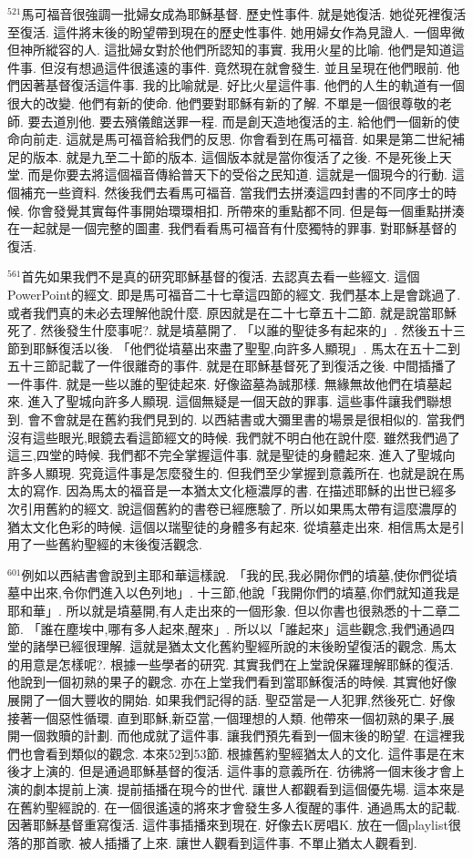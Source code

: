 \documentclass{book}
\begin{document}
$^{521}$馬可福音很強調一批婦女成為耶穌基督.
歷史性事件.
就是她復活.
她從死裡復活至復活.
這件將末後的盼望帶到現在的歷史性事件.
她用婦女作為見證人.
一個卑微但神所縱容的人.
這批婦女對於他們所認知的事實.
我用火星的比喻.
他們是知道這件事.
但沒有想過這件很遙遠的事件.
竟然現在就會發生.
並且呈現在他們眼前.
他們因著基督復活這件事.
我的比喻就是.
好比火星這件事.
他們的人生的軌道有一個很大的改變.
他們有新的使命.
他們要對耶穌有新的了解.
不單是一個很尊敬的老師.
要去道別他.
要去殯儀館送罪一程.
而是創天造地復活的主.
給他們一個新的使命向前走.
這就是馬可福音給我們的反思.
你會看到在馬可福音.
如果是第二世紀補足的版本.
就是九至二十節的版本.
這個版本就是當你復活了之後.
不是死後上天堂.
而是你要去將這個福音傳給普天下的受俗之民知道.
這就是一個現今的行動.
這個補充一些資料.
然後我們去看馬可福音.
當我們去拼湊這四封書的不同序士的時候.
你會發覺其實每件事開始環環相扣.
所帶來的重點都不同.
但是每一個重點拼湊在一起就是一個完整的圖畫.
我們看看馬可福音有什麼獨特的罪事.
對耶穌基督的復活.

$^{561}$首先如果我們不是真的研究耶穌基督的復活.
去認真去看一些經文.
這個PowerPoint的經文.
即是馬可福音二十七章這四節的經文.
我們基本上是會跳過了.
或者我們真的未必去理解他說什麼.
原因就是在二十七章五十二節.
就是說當耶穌死了.
然後發生什麼事呢?.
就是墳墓開了.
「以誰的聖徒多有起來的」.
然後五十三節到耶穌復活以後.
「他們從墳墓出來盡了聖聖,向許多人顯現」.
馬太在五十二到五十三節記載了一件很離奇的事件.
就是在耶穌基督死了到復活之後.
中間插播了一件事件.
就是一些以誰的聖徒起來.
好像盜墓為誠那樣.
無緣無故他們在墳墓起來.
進入了聖城向許多人顯現.
這個無疑是一個天啟的罪事.
這些事件讓我們聯想到.
會不會就是在舊約我們見到的.
以西結書或大彌里書的場景是很相似的.
當我們沒有這些眼光,眼鏡去看這節經文的時候.
我們就不明白他在說什麼.
雖然我們過了這三,四堂的時候.
我們都不完全掌握這件事.
就是聖徒的身體起來.
進入了聖城向許多人顯現.
究竟這件事是怎麼發生的.
但我們至少掌握到意義所在.
也就是說在馬太的寫作.
因為馬太的福音是一本猶太文化極濃厚的書.
在描述耶穌的出世已經多次引用舊約的經文.
說這個舊約的書卷已經應驗了.
所以如果馬太帶有這麼濃厚的猶太文化色彩的時候.
這個以瑞聖徒的身體多有起來.
從墳墓走出來.
相信馬太是引用了一些舊約聖經的末後復活觀念.

$^{601}$例如以西結書會說到主耶和華這樣說.
「我的民,我必開你們的墳墓,使你們從墳墓中出來,令你們進入以色列地」.
十三節,他說「我開你們的墳墓,你們就知道我是耶和華」.
所以就是墳墓開,有人走出來的一個形象.
但以你書也很熟悉的十二章二節.
「誰在塵埃中,哪有多人起來,醒來」.
所以以「誰起來」這些觀念,我們通過四堂的諸學已經很理解.
這就是猶太文化舊約聖經所說的末後盼望復活的觀念.
馬太的用意是怎樣呢?.
根據一些學者的研究.
其實我們在上堂說保羅理解耶穌的復活.
他說到一個初熟的果子的觀念.
亦在上堂我們看到當耶穌復活的時候.
其實他好像展開了一個大豐收的開始.
如果我們記得的話.
聖亞當是一人犯罪,然後死亡.
好像接著一個惡性循環.
直到耶穌,新亞當,一個理想的人類.
他帶來一個初熟的果子,展開一個救贖的計劃.
而他成就了這件事.
讓我們預先看到一個末後的盼望.
在這裡我們也會看到類似的觀念.
本來52到53節.
根據舊約聖經猶太人的文化.
這件事是在末後才上演的.
但是通過耶穌基督的復活.
這件事的意義所在.
彷彿將一個末後才會上演的劇本提前上演.
提前插播在現今的世代.
讓世人都觀看到這個優先場.
這本來是在舊約聖經說的.
在一個很遙遠的將來才會發生多人復醒的事件.
通過馬太的記載.
因著耶穌基督重寫復活.
這件事插播來到現在.
好像去K房唱K.
放在一個playlist很落的那首歌.
被人插播了上來.
讓世人觀看到這件事.
不單止猶太人觀看到.
\end{document}
